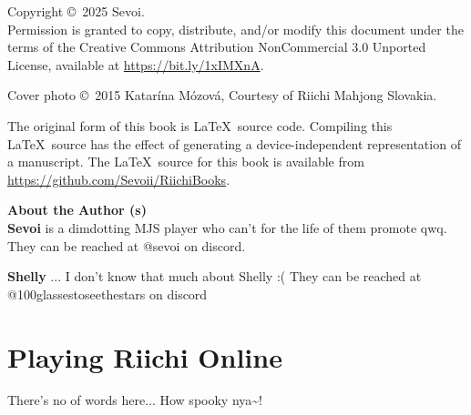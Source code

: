 \documentclass{book}
\begin{document}
\pagebreak
\thispagestyle{empty}

\noindent
{\small
Copyright \copyright ~2025 Sevoi.\\
Permission is granted to copy, distribute, and/or modify this document
under the terms of the Creative Commons Attribution NonCommercial 3.0 Unported License, available at \url{https://bit.ly/1xIMXnA}.

\vspace{.2in}
\noindent
Cover photo \copyright ~2015 Katar\'{i}na M\'{o}zov\'{a}, Courtesy of Riichi Mahjong Slovakia. 

\vspace{.2in}

\noindent
The original form of this book is \LaTeX\ source code.  Compiling this
\LaTeX\ source has the effect of generating a device-independent
representation of a manuscript. The \LaTeX\ source for this book is available from 
\url{https://github.com/Sevoii/RiichiBooks}.

\vfill
\noindent
{\large\bf About the Author (s)}\\

\noindent
{\bf Sevoi} is a dimdotting MJS player who can't for the life of them promote qwq.
They can be reached at @sevoi on discord.

\noindent
{\bf Shelly} ... I don't know that much about Shelly :(
They can be reached at @100glassestoseethestars on discord
} %


\pagebreak

\let\cleardoublepage\clearpage




%

%
%
\part{Playing Riichi Online} \label{part:online}

There's no of words here... How spooky nya\textasciitilde!

%
%
\end{document}
